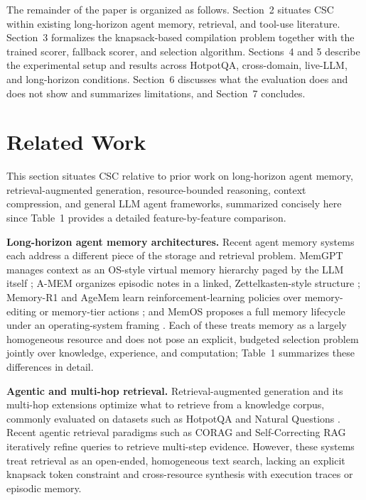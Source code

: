 \documentclass{article}
\begin{document}
The remainder of the paper is organized as follows. Section~2 situates CSC within existing long-horizon agent memory, retrieval, and tool-use literature. Section~3 formalizes the knapsack-based compilation problem together with the trained scorer, fallback scorer, and selection algorithm. Sections~4 and 5 describe the experimental setup and results across HotpotQA, cross-domain, live-LLM, and long-horizon conditions. Section~6 discusses what the evaluation does and does not show and summarizes limitations, and Section~7 concludes.

\section{Related Work}

This section situates CSC relative to prior work on long-horizon agent memory, retrieval-augmented generation, resource-bounded reasoning, context compression, and general LLM agent frameworks, summarized concisely here since Table~1 provides a detailed feature-by-feature comparison.

\textbf{Long-horizon agent memory architectures.} Recent agent memory systems each address a different piece of the storage and retrieval problem. MemGPT manages context as an OS-style virtual memory hierarchy paged by the LLM itself \citep{packer2023memgpt}; A-MEM organizes episodic notes in a linked, Zettelkasten-style structure \citep{xu2025amem}; Memory-R1 and AgeMem learn reinforcement-learning policies over memory-editing or memory-tier actions \citep{yan2025memoryr1, yu2026agemem}; and MemOS proposes a full memory lifecycle under an operating-system framing \citep{li2025memos}. Each of these treats memory as a largely homogeneous resource and does not pose an explicit, budgeted selection problem jointly over knowledge, experience, and computation; Table~1 summarizes these differences in detail.

\textbf{Agentic and multi-hop retrieval.} Retrieval-augmented generation \citep{lewis2020rag} and its multi-hop extensions optimize what to retrieve from a knowledge corpus, commonly evaluated on datasets such as HotpotQA \citep{yang2018hotpotqa} and Natural Questions \citep{kwiatkowski2019naturalquestions}. Recent agentic retrieval paradigms such as CORAG \citep{wang2024corag} and Self-Correcting RAG \citep{xu2026selfcorrecting} iteratively refine queries to retrieve multi-step evidence. However, these systems treat retrieval as an open-ended, homogeneous text search, lacking an explicit knapsack token constraint and cross-resource synthesis with execution traces or episodic memory.
\end{document}
